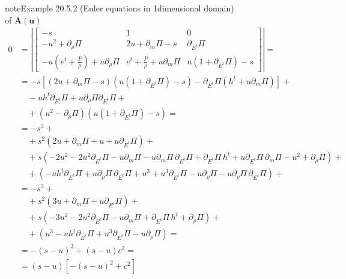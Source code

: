 \documentclass[letterpaper,10pt,english]{jupyterBook}
\begin{document}
\begin{sphinxadmonition}{note}{Example 20.5.2 (Euler equations in 1\sphinxhyphen{}dimensional domain)}
\begin{equation*}
\end{equation*}
\sphinxAtStartPar
{} of \(\mathbf{A}(\mathbf{u})\)
\begin{equation*}
\begin{split}
  0
  & = \left| \begin{bmatrix} -s & 1 & 0 \\ 
   -u^2 + \partial_\rho \Pi & 2 u + \partial_m \Pi - s & \partial_{E^t} \Pi \\
   - u \left(e^t+\frac{P}{\rho} \right)+ u \partial_\rho \Pi & e^t + \frac{P}{\rho} + u \partial_{m} \Pi & u \left( 1 + \partial_{E^t} \Pi \right) - s
  \end{bmatrix} \right| = \\
  & = - s \left[ \left( 2 u + \partial_m \Pi - s  \right) \left( u \left( 1 + \partial_{E^t} \Pi \right) - s \right) - \partial_{E^t} \Pi \left( h^t + u \partial_m \Pi \right) \right] + \\
  & \quad - u h^t \partial_{E^t} \Pi + u \partial_\rho \Pi \partial_{E^t} \Pi + \\
  & \quad + (u^2 - \partial_\rho \Pi) \left( u (1 + \partial_{E^t} \Pi) - s \right) = \\
  & = -s^3 + \\
  & \quad + s^2 \left( 2 u + \partial_m \Pi + u + u \partial_{E^t} \Pi  \right) + \\
  & \quad + s   \left( - 2 u^2 - 2u^2 \partial_{E^t} \Pi - u \partial_m \Pi - u \partial_m \Pi \, \partial_{E^t} \Pi + \partial_{E^t} \Pi \, h^t + u \partial_{E^t} \Pi \, \partial_m \Pi - u^2 + \partial_{\rho} \Pi  \right) + \\
  & \quad +     \left( -u h^t \partial_{E^t} \Pi + u \partial_{\rho} \Pi \, \partial_{E^t} \Pi + u^3 + u^3 \partial_{E^t} \Pi - u \partial_{\rho} \Pi - u \partial_{\rho} \Pi \, \partial_{E^t} \Pi \right) + \\
  & = -s^3 + \\
  & \quad + s^2 \left( 3 u + \partial_m \Pi + u \partial_{E^t} \Pi  \right) + \\
  & \quad + s   \left( - 3 u^2 - 2u^2 \partial_{E^t} \Pi - u \partial_m \Pi + \partial_{E^t} \Pi \, h^t + \partial_{\rho} \Pi  \right) + \\
  & \quad +     \left( u^3 - u h^t \partial_{E^t} \Pi + u^3 \partial_{E^t} \Pi - u \partial_{\rho} \Pi \right) = \\
  & = - (s - u)^3 + ( s - u ) c^2 = \\
  & = ( s - u ) \left[ -(s-u)^2 + c^2 \right]
\end{split}

\end{equation*}
\end{sphinxadmonition}
\end{document}
